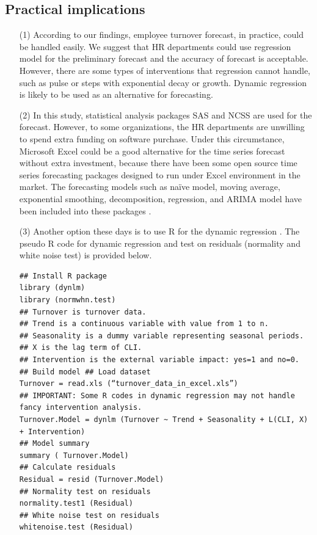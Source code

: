 \subsection{Practical implications}
\begin{itemize}
\item[(1)]	According to our findings, employee turnover forecast, in practice, could be handled easily. We suggest that HR departments could use regression model for the preliminary forecast and the accuracy of forecast is acceptable. However, there are some types of interventions that regression cannot handle, such as pulse or steps with exponential decay or growth. Dynamic regression is likely to be used as an alternative for forecasting.
\item[(2)] In this study, statistical analysis packages SAS and NCSS are used for the forecast. However, to some organizations, the HR departments are unwilling to spend extra funding on software purchase. Under this circumstance, Microsoft Excel could be a good alternative for the time series forecast without extra investment, because there have been some open source time series forecasting packages designed to run under Excel environment in the market. The forecasting models such as naïve model, moving average, exponential smoothing, decomposition, regression, and ARIMA model have been included into these packages \citep{warren2008}.
\item[(3)]	Another option these days is to use R for the dynamic regression \citep{hyndman2014}. The pseudo R code for dynamic regression and test on residuals (normality and white noise test) is provided below. 
\begin{lstlisting}
## Install R package
library (dynlm)
library (normwhn.test)
## Turnover is turnover data.  
## Trend is a continuous variable with value from 1 to n. 
## Seasonality is a dummy variable representing seasonal periods. 
## X is the lag term of CLI.
## Intervention is the external variable impact: yes=1 and no=0.
## Build model ## Load dataset
Turnover = read.xls (“turnover_data_in_excel.xls”)
## IMPORTANT: Some R codes in dynamic regression may not handle fancy intervention analysis.
Turnover.Model = dynlm (Turnover ~ Trend + Seasonality + L(CLI, X) + Intervention) 
## Model summary
summary ( Turnover.Model)
## Calculate residuals
Residual = resid (Turnover.Model)
## Normality test on residuals
normality.test1 (Residual)
## White noise test on residuals
whitenoise.test (Residual)
\end{lstlisting}
\end{itemize}
